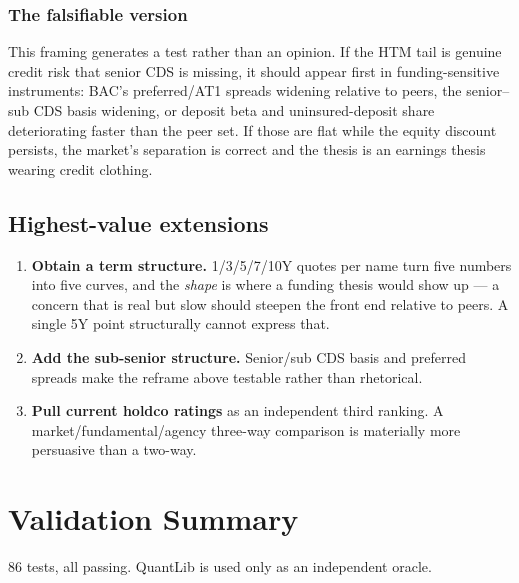 \documentclass[11pt,a4paper]{article}
\begin{document}
\subsubsection*{The falsifiable version}

This framing generates a test rather than an opinion. If the HTM tail is genuine credit risk
that senior CDS is missing, it should appear first in funding-sensitive instruments: BAC's
preferred/AT1 spreads widening relative to peers, the senior--sub CDS basis widening, or
deposit beta and uninsured-deposit share deteriorating faster than the peer set. If those are
flat while the equity discount persists, the market's separation is correct and the thesis is
an earnings thesis wearing credit clothing.

\subsection{Highest-value extensions}

\begin{enumerate}[leftmargin=1.4em]
\item \textbf{Obtain a term structure.} 1/3/5/7/10Y quotes per name turn five numbers into
five curves, and the \emph{shape} is where a funding thesis would show up --- a concern that is
real but slow should steepen the front end relative to peers. A single 5Y point structurally
cannot express that.
\item \textbf{Add the sub-senior structure.} Senior/sub CDS basis and preferred spreads make
the reframe above testable rather than rhetorical.
\item \textbf{Pull current holdco ratings} as an independent third ranking. A
market/fundamental/agency three-way comparison is materially more persuasive than a two-way.
\end{enumerate}

\newpage
\section{Validation Summary}

86 tests, all passing. QuantLib is used only as an independent oracle.
\end{document}

